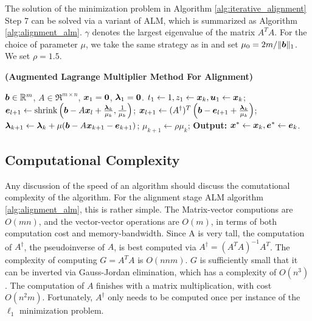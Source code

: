 \documentclass[10pt,twocolumn,letterpaper]{article}
\begin{document}
The solution of the minimization problem in Algorithm
\eqref{alg:iterative_alignment} Step 7 can be solved via a
variant of ALM, which is summarized as Algorithm \eqref{alg:alignment_alm}.
$\gamma$ denotes the largest eigenvalue of the matrix $A^TA$. For the choice of
parameter $\mu$, we take the same strategy as in \cite{YangJ2009-pp} and set
$\mu_0 = 2m / \|{\boldsymbol{b}}\|_1$. We set $\rho=1.5$.

\begin{algorithm}[h]
\caption{\bf (Augmented Lagrange Multiplier Method For Alignment)}
\begin{algorithmic}[1]
 ${\boldsymbol{b}} \in {\mathbb{R}}^m$, $A \in \Re^{m \times n}$,
${\boldsymbol{x}}_1 = \boldsymbol{0}$, $\boldsymbol{\lambda}_1 = \boldsymbol{0}$.
\STATE $t_{1} \leftarrow 1, z_{1} \leftarrow {\boldsymbol{x}}_{k}, \boldsymbol{u}_{1} \leftarrow {\boldsymbol{x}}_{k}$;
\STATE $\boldsymbol{e}_{l+1} \leftarrow \textup{shrink}\left({\boldsymbol{b}} - A{\boldsymbol{x}}_l + \frac{\boldsymbol{\lambda}_k}{\mu_k}, \frac{1}{\mu_k}\right)$;
\STATE ${\boldsymbol{x}}_{l+1} \leftarrow (A^\dagger)^T \left({\boldsymbol{b}} - \boldsymbol{e}_{l+1} + \frac{\boldsymbol{\lambda}_k}{\mu_k} \right) $;
\ENDWHILE
\STATE $\boldsymbol{\lambda}_{k+1} \leftarrow \boldsymbol{\lambda}_k + \mu ({\boldsymbol{b}} - A{\boldsymbol{x}}_{k+1} - \boldsymbol{e}_{k+1})$;
\STATE $\mu_{k+1} \leftarrow \rho\mu_k$;
\ENDWHILE \STATE
{\bf Output:} ${\boldsymbol{x}}^* \leftarrow {\boldsymbol{x}}_k, \boldsymbol{e}^* \leftarrow \boldsymbol{e}_k$.
\end{algorithmic}
\label{alg:alignment_alm}
\end{algorithm}

\subsection{Computational Complexity} Any discussion of the speed of an
algorithm should discuss the comutational complexity of the algorithm.  For the
alignment stage ALM algorithm \eqref{alg:alignment_alm}, this is rather simple.
The Matrix-vector computions are $O(mn)$, and the vector-vector operations are
$O(m)$, in terms of both computation cost and memory-bandwidth.  Since A is
very tall, the computation of $A^\dagger$, the pseudoinverse of $A$, is best
computed via $A^\dagger = (A^TA)^{-1} A^T$.  The complexity of computing $G =
A^T A$ is $O(nnm)$.  $G$ is sufficiently small that it can be inverted via
Gauss-Jordan elimination, which has a complexity of $O(n^3)$.  The computation
of $A$ finishes with a matrix multiplication, with cost $O(n^2 m)$.
Fortunately, $A^\dagger$ only needs to be computed once per instance of the
$\ell_1$ minimization problem.
\end{document}
